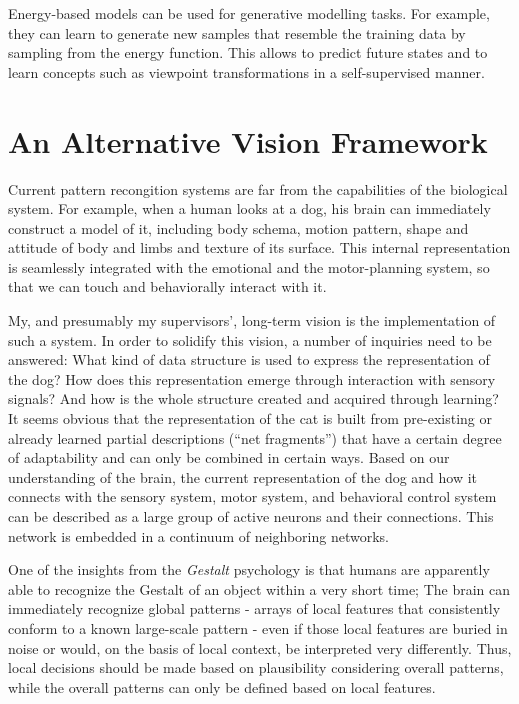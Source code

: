Energy-based models can be used for generative modelling tasks. For example, they can learn to generate new samples that resemble the training data by sampling from the energy function. This allows to predict future states and to learn concepts such as viewpoint transformations in a self-supervised manner.


\section{An Alternative Vision Framework}
Current pattern recongition systems are far from the capabilities of the biological system.
For example, when a human looks at a dog, his brain can immediately construct a model of it, 
including body schema, motion pattern, shape and attitude of body and limbs and texture of its surface.  
This internal representation is seamlessly integrated with the emotional and the motor-planning system, so that we can touch and behaviorally interact with it.


My, and presumably my supervisors', long-term vision is the implementation of such a system. In order to solidify this vision, a number of inquiries need to be answered: What kind of data structure is used to express the representation of the dog? How does this representation emerge through interaction with sensory signals? And how is the whole structure created and acquired through learning? It seems obvious that the representation of the cat is built from pre-existing or already learned partial descriptions (``net fragments'') that have a certain degree of adaptability and can only be combined in certain ways.
Based on our understanding of the brain, the current representation of the dog and how it connects with the sensory system, motor system, and behavioral control system can be described as a large group of active neurons and their connections. This network is embedded in a continuum of neighboring networks.

One of the insights from the \emph{Gestalt} psychology is that humans are apparently able to recognize the Gestalt of an object within a very short time; The brain can immediately recognize global patterns - arrays of local features that consistently conform to a known large-scale pattern - even if those local features are buried in noise or would, on the basis of local context, be interpreted very differently. Thus, local decisions should be made based on plausibility considering overall patterns, while the overall patterns can only be defined based on local features.

